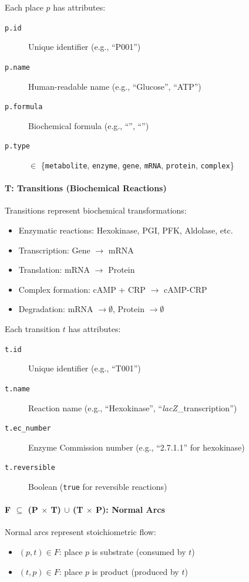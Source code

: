 Each place $p$ has attributes:
\begin{description}
    \item[\texttt{p.id}] Unique identifier (e.g., ``P001'')
    \item[\texttt{p.name}] Human-readable name (e.g., ``Glucose'', ``ATP'')
    \item[\texttt{p.formula}] Biochemical formula (e.g., ``'', ``'')
    \item[\texttt{p.type}] $\in$ \{\texttt{metabolite}, \texttt{enzyme}, \texttt{gene}, \texttt{mRNA}, \texttt{protein}, \texttt{complex}\}
\end{description}

\paragraph{T: Transitions (Biochemical Reactions)}
Transitions represent biochemical transformations:
\begin{itemize}
    \item Enzymatic reactions: Hexokinase, PGI, PFK, Aldolase, etc.
    \item Transcription: Gene $\to$ mRNA
    \item Translation: mRNA $\to$ Protein
    \item Complex formation: cAMP + CRP $\to$ cAMP-CRP
    \item Degradation: mRNA $\to \emptyset$, Protein $\to \emptyset$
\end{itemize}

Each transition $t$ has attributes:
\begin{description}
    \item[\texttt{t.id}] Unique identifier (e.g., ``T001'')
    \item[\texttt{t.name}] Reaction name (e.g., ``Hexokinase'', ``\textit{lacZ}\_transcription'')
    \item[\texttt{t.ec\_number}] Enzyme Commission number (e.g., ``2.7.1.1'' for hexokinase)
    \item[\texttt{t.reversible}] Boolean (\texttt{true} for reversible reactions)
\end{description}

\paragraph{F $\subseteq$ (P $\times$ T) $\cup$ (T $\times$ P): Normal Arcs}
Normal arcs represent stoichiometric flow:
\begin{itemize}
    \item $(p,t) \in F$: place $p$ is substrate (consumed by $t$)
    \item $(t,p) \in F$: place $p$ is product (produced by $t$)
\end{itemize}

